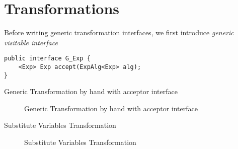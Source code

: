 \section{Transformations}\label{sec:transformations}
\label{retroimp}

Before writing generic transformation interfaces, we first introduce \emph{generic visitable interface}
\begin{lstlisting}[numbers=none] 
public interface G_Exp {
	<Exp> Exp accept(ExpAlg<Exp> alg);
}
\end{lstlisting}

Generic Transformation by hand with acceptor interface
\begin{figure}[tb]
\vspace{-.1in}
\caption{Generic Transformation by hand with acceptor interface\label{sec:transformations}}
\end{figure}

Substitute Variables Transformation
\begin{figure}[tb]
\vspace{-.1in}
\caption{Substitute Variables Transformation\label{sec:transformations}}
\end{figure}
